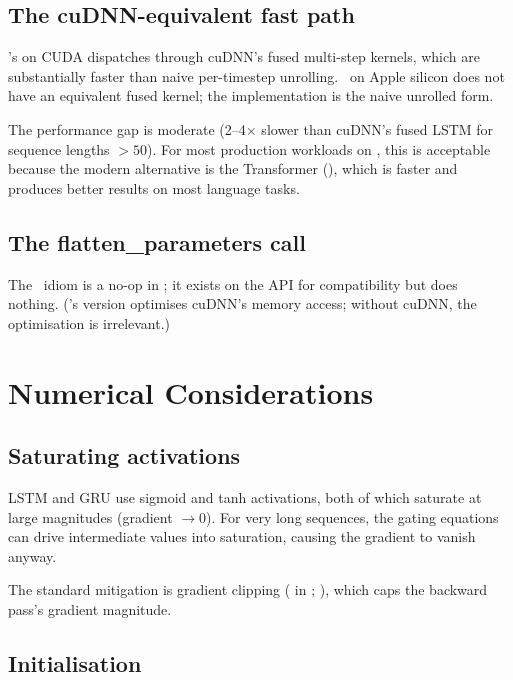 \subsection{The cuDNN-equivalent fast path}
\label{ssec:rnn_family:fast_path}

's  on CUDA dispatches through cuDNN's
fused multi-step kernels, which are substantially faster than
naive per-timestep unrolling. \Lucid\ on Apple silicon does not
have an equivalent fused kernel; the implementation is the naive
unrolled form.

The performance gap is moderate (2--4$\times$ slower than cuDNN's
fused LSTM for sequence lengths $> 50$). For most production
workloads on \Lucid, this is acceptable because the modern
alternative is the Transformer (), which is
faster and produces better results on most language tasks.

\subsection{The flatten\_parameters call}
\label{ssec:rnn_family:flatten_parameters}

The \ idiom  is a
no-op in \Lucid; it exists on the API for compatibility but does
nothing. ('s version optimises cuDNN's memory
access; without cuDNN, the optimisation is irrelevant.)

\section{Numerical Considerations}
\label{sec:rnn_family:numerical}

\subsection{Saturating activations}
\label{ssec:rnn_family:saturating}

LSTM and GRU use sigmoid and tanh activations, both of which
saturate at large magnitudes (gradient $\to 0$). For very long
sequences, the gating equations can drive intermediate values
into saturation, causing the gradient to vanish anyway.

The standard mitigation is gradient clipping (
in ; ), which caps the
backward pass's gradient magnitude.

\subsection{Initialisation}
\label{ssec:rnn_family:rnn_init}

